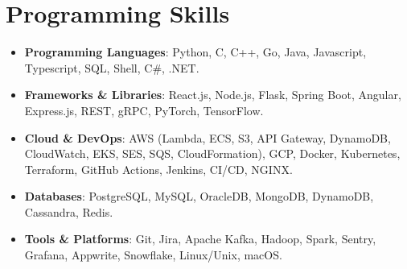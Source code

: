 \documentclass[a4paper, 10pt]{article}
\begin{document}
\section{Programming Skills}
    \vspace{-5pt}
    \begin{itemize}[itemsep=-1pt, leftmargin=0in, label={}]
        \item{\textbf{Programming Languages}: Python, C, C++, Go, Java, Javascript, Typescript, SQL, Shell, C\#, .NET.}
        \item{\textbf{Frameworks \& Libraries}: React.js, Node.js, Flask, Spring Boot, Angular, Express.js, REST, gRPC, PyTorch, TensorFlow.}
        \item{\textbf{Cloud \& DevOps}: AWS (Lambda, ECS, S3, API Gateway, DynamoDB, CloudWatch, EKS, SES, SQS, CloudFormation), GCP, Docker, Kubernetes, Terraform, GitHub Actions, Jenkins, CI/CD, NGINX.}
        \item{\textbf{Databases}: PostgreSQL, MySQL, OracleDB, MongoDB, DynamoDB, Cassandra, Redis.}
        \item {\textbf{Tools \& Platforms}: Git, Jira, Apache Kafka, Hadoop, Spark, Sentry, Grafana, Appwrite, Snowflake, Linux/Unix, macOS.}
    \end{itemize}

\vspace{-15pt}
\end{document}
